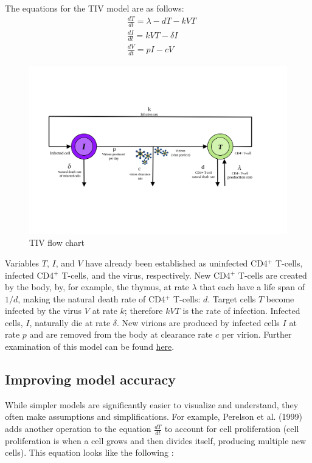 \documentclass[letterpaper, 11 pt, conference]{ieeeconf}
\begin{document}
The equations for the TIV model are as follows: \cite{TIVdiagram}
\begin{equation}\label{eq. (1)}
    \begin{split} 
        & \frac{dT}{dt} = \lambda - d T - k V T \\
        & \frac{dI}{dt} = k V T - \delta I \\
        & \frac{dV}{dt} = p I - c V
    \end{split}
\end{equation}

\begin{figure}[thpb]
      \centering
      \includegraphics[scale = .2]{Images/TIV.png}
      \caption{TIV flow chart}
      \label{fig:1}
\end{figure}

Variables $T$, $I$, and $V$ have already been established as uninfected CD4$^{+}$ T-cells, infected CD4$^{+}$ T-cells, and the virus, respectively. New CD4$^{+}$ T-cells are created by the body, by, for example, the thymus, at rate $\lambda$ that each have a life span of $1/d$, making the natural death rate of CD4$^{+}$ T-cells: $d$. Target cells $T$ become infected by the virus $V$ at rate $k$; therefore $kVT$ is the rate of infection. Infected cells, $I$, naturally die at rate $\delta$. New virions are produced by infected cells $I$ at rate $p$ and are removed from the body at clearance rate $c$ per virion. Further examination of this model can be found \href{https://doi.org/10.1137/S0036144598335107}{here}.
 
\subsection{Improving model accuracy}
While simpler models are significantly easier to visualize and understand, they often make assumptions and simplifications. For example, Perelson et al. (1999) \cite{perelson1999} adds another operation to the equation $\frac{dT}{dt}$ to account for cell proliferation (cell proliferation is when a cell grows and then divides itself, producing multiple new cells). This equation looks like the following \cite{perelson1999}: 
\end{document}

